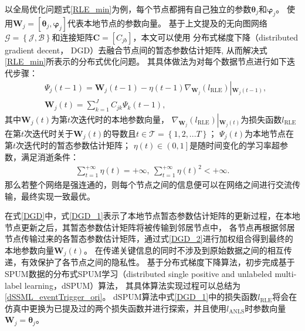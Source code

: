 以全局优化问题式\eqref{RLE_min}为例，每个节点都拥有自己独立的参数$\boldsymbol \theta_j$和$\boldsymbol \varphi_j$。
使用$\boldsymbol W_j=\left[\boldsymbol\theta_j,\boldsymbol\varphi_j\right]$代表本地节点的参数向量。
基于上文提及的无向图网络$\mathcal{G}=\left\{\mathcal{J},\mathcal{B}\right\}$和连接矩阵$\boldsymbol C=[C_{jb}]$，本文可以使用
分布式梯度下降（distributed gradient decent， DGD）\cite{Scardapane_Distributed_2016}去融合节点间的暂态参数估计矩阵,
从而解决式\eqref{RLE_min}所表示的分布式优化问题。
其具体做法为对每个数据节点进行如下迭代步骤：
\begin{subequations}
    \label{DGD}
    \begin{align}
        &\boldsymbol\varPsi_j\left(t-1\right)=\boldsymbol W_j\left(t-1\right)-
        \eta\left(t-1\right)\nabla_{\boldsymbol W_j}\left(l_{\mathrm{RLE}}\right)\left|_{\boldsymbol W_j\left(t-1\right)}\right.,
        \label{DGD_1} \\
        &\boldsymbol W_j\left(t\right)=\sum_{k=1}^{J}C_{jk}\boldsymbol\varPsi_k\left(t-1\right), \label{DGD_2}
    \end{align}
\end{subequations}
其中$\boldsymbol W_j\left(t\right)$为第$t$次迭代时的本地参数向量，
$\nabla_{\boldsymbol W_j}\left(l_{\mathrm{RLE}}\right)\left|_{\boldsymbol W_j\left(t\right)}\right.$为损失函数$l_{\mathrm{RLE}}$
在第$t$次迭代时关于$\boldsymbol W_j\left(t\right)$的导数且$t\in\mathcal{T}=\left\{1,2,...T\right\}$；
$\boldsymbol\varPsi_j\left(t\right)$为本地节点在第$t$次迭代时的暂态参数估计矩阵；
$\eta\left(t\right)\in\left(0,1\right]$是随时间变化的学习率超参数，满足消逝条件\cite{Bottou_Vanish1_2010,Shalev_Vanish2_2011}：
\begin{equation}
    \label{VanishCondition}
    \begin{split}
        \sum_{t=1}^{+\infty}{\eta\left(t\right)}=+\infty, ~\sum_{t=1}^{+\infty}{\eta\left(t\right)}^2<+\infty.
    \end{split}
\end{equation}
那么若整个网络是强连通的，则每个节点之间的信息便可以在网络之间进行交流传输，最终实现一致最优\cite{Geary_Incremental_1999}。

在式\eqref{DGD}中，式\eqref{DGD_1}表示了本地节点暂态参数估计矩阵的更新过程，在本地节点更新之后，其暂态参数估计矩阵将被传输到邻居节点中，
各节点再根据邻居节点传输过来的各暂态参数估计矩阵，通过式\eqref{DGD_2}进行加权组合得到最终的本地参数向量$\boldsymbol W_j\left(t\right)$。
在传递关键信息的同时不涉及到原始数据之间的相互传递，有效保护了各节点之间的隐私性。
基于分布式梯度下降算法，初步完成基于SPUM数据的分布式SPUM学习（distributed single positive and unlabeled multi-label learning，dSPUM）算法，
其具体算法实现过程可以总结为\autoref{dSSML_eventTrigger_ori}。
dSPUM算法中式\eqref{DGD_1}中的损失函数$l_{\mathrm{RLE}}$将会在仿真中更换为已提及过的两个损失函数并进行探索，并且使用$l_{\mathrm{ANLS}}$时参数向量$\boldsymbol W_j=\boldsymbol \theta_j$。

